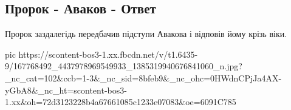  
 
 
 
 

\subsection{Пророк - Аваков - Ответ}
\label{sec:07_04_2021.fb.promovugroup.1.shevchenko_avakov}

Пророк заздалегідь передбачив підступи Авакова і відповів йому крізь віки.

\ifcmt
  pic https://scontent-bos3-1.xx.fbcdn.net/v/t1.6435-9/167768492_4437978969549933_1385319940676841060_n.jpg?_nc_cat=102&ccb=1-3&_nc_sid=8bfeb9&_nc_ohc=0HWdnCPjJa4AX-yGbA8&_nc_ht=scontent-bos3-1.xx&oh=72d3123228b4a67661085c1233e07083&oe=6091C785
\fi

